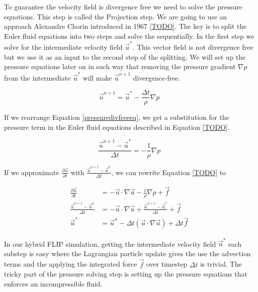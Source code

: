 To guarantee the velocity field is divergence free we need to solve the pressure equations. This step is called the Projection step. We are going to use an approach Alexandre Chorin introduced in 1967 \ref{TODO}. The key is to split the Euler fluid equations into two steps and solve the sequentially. In the first step we solve for the intermediate velocity field $\vec{u}^*$. This vector field is not divergence free but we use it as an input to the second step of the splitting. We will set up the pressure equations later on in such way that removing the pressure gradient $\nabla p$ from the intermediate $\vec{u}^*$ will make $\vec{u}^{n+1}$ divergence-free.

\begin{equation}
\vec{u}^{n+1} = \vec{u}^* - \frac{\Delta t}{\rho} \nabla p
\label{pressuredivfreeeq}
\end{equation}

If we rearrange Equation \ref{pressuredivfreeeq}, we get a substitution for the pressure term in the Euler fluid equations described in Equation \ref{TODO}.

\begin{equation}
\frac{\vec{u}^{n+1} - \vec{u}^*}{\Delta t}= - \frac{1}{\rho} \nabla p
\label{pressuredivfreeeq}
\end{equation}

If we approximate $\frac{\partial \vec{u}}{\partial t}$ with $\frac{\vec{u}^{n+1} - \vec{u}^{n}}{\Delta t}$, we can rewrite Equation \ref {TODO} to

\begin{equation}
\begin{split}
\frac{\partial \vec{u}}{\partial t}  &= -\vec{u} \cdot \nabla \vec{u} - \frac{1}{\rho}\nabla p + \vec{f}\\
\frac{\vec{u}^{n+1} - \vec{u}^{n}}{\Delta t}  &= - \vec{u} \cdot \nabla \vec{u} + \frac{\vec{u}^{n+1} - \vec{u}^*}{\Delta t} + \vec{f} \\
\vec{u}^* & = \vec{u}^n - \Delta t(\vec{u} \cdot \nabla \vec{u}) + \Delta t\vec{f}
\end{split}
\end{equation}

In our hybrid FLIP simulation, getting the intermediate velocity field  $\vec{u}^*$ each substep is easy where the Lagrangian particle update gives the use the advection terms and the applying the integrated force $\vec{f}$ over timestep $\Delta t$ is trivial. The tricky part of the pressure solving step is setting up the pressure equations that enforces an incompressible fluid.
